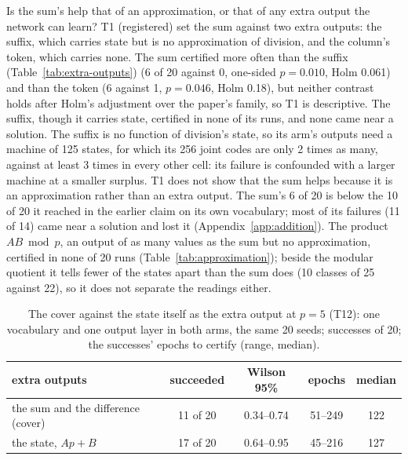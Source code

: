 \documentclass[11pt]{article}
\newcommand{\pn}[2]{#2}
\begin{document}
Is the sum's help that of an approximation, or that of any extra output the network can learn? T1
(registered) set the sum against two extra outputs: the suffix, which carries state but
is no approximation of division, and the column's token, which carries none. The sum certified more
often than the suffix (Table~\ref{tab:extra-outputs}) (\pn{k5.sum}{6} of 20 against \pn{k5.suffix}{0}, one-sided
$p = \pn{k5.suffix-p}{0.010}$, Holm \pn{k5.suffix-holm}{0.061}) and than the token (\pn{k5.sum}{6}
against \pn{k5.token}{1}, $p = \pn{k5.token-p}{0.046}$, Holm \pn{k5.token-holm}{0.18}), but
neither contrast holds after Holm's adjustment over the paper's family, so T1 is descriptive. The suffix,
though it carries state, certified in \pn{k5.suffix-certified}{none} of its runs, and
\pn{k5.suffix-near}{none} came near a solution. The suffix is no function of division's state, so its arm's outputs need a
machine of 125 states, for which its 256 joint codes are only 2 times as many, against at least 3
times in every other cell: its failure is confounded with a larger machine at a smaller surplus. T1 does not show that the sum helps because it is an approximation rather
than an extra output. The sum's \pn{k5.sum}{6} of 20 is below the \pn{k5.claim-sum}{10} of
20 it reached in the earlier claim on its own vocabulary; most of its failures
(\pn{k5.sum-near}{11 of 14}) came near a solution and lost it (Appendix~\ref{app:addition}).
The product $AB \bmod p$, an output of as many values as the sum but no approximation, certified in
none of 20 runs (Table~\ref{tab:approximation}); beside the modular quotient it tells fewer of the states
apart than the sum does (10 classes of 25 against 22), so it does not separate the readings either.

\begin{table}[t]
\centering
\caption{The cover against the state itself as the extra output at $p = 5$ (T12): one vocabulary and
one output layer in both arms, the same 20 seeds; successes of 20; the successes' epochs to certify
(range, median).}
\label{tab:state}
\begin{tabular}{lcccc}
\toprule
extra outputs & succeeded & Wilson 95\% & epochs & median \\
\midrule
the sum and the difference (cover) & 11 of 20 & 0.34--0.74 & 51--249 & 122 \\
the state, $A p + B$ & 17 of 20 & 0.64--0.95 & 45--216 & 127 \\
\bottomrule
\end{tabular}
\end{table}
\end{document}
